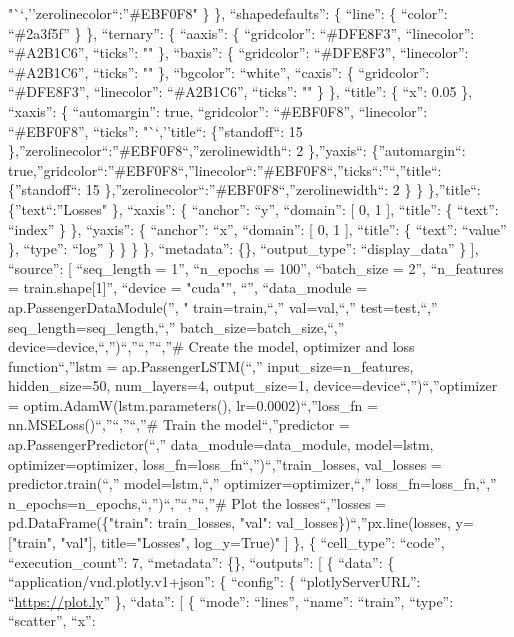 \documentclass[
]{article}
\begin{document}
"``,''zerolinecolor``:''\#EBF0F8" \} \}, ``shapedefaults'': \{ ``line'':
\{ ``color'': ``\#2a3f5f'' \} \}, ``ternary'': \{ ``aaxis'': \{
``gridcolor'': ``\#DFE8F3'', ``linecolor'': ``\#A2B1C6'', ``ticks'': ""
\}, ``baxis'': \{ ``gridcolor'': ``\#DFE8F3'', ``linecolor'':
``\#A2B1C6'', ``ticks'': "" \}, ``bgcolor'': ``white'', ``caxis'': \{
``gridcolor'': ``\#DFE8F3'', ``linecolor'': ``\#A2B1C6'', ``ticks'': ""
\} \}, ``title'': \{ ``x'': 0.05 \}, ``xaxis'': \{ ``automargin'': true,
``gridcolor'': ``\#EBF0F8'', ``linecolor'': ``\#EBF0F8'', ``ticks'':
"``,''title``: \{''standoff``: 15
\},''zerolinecolor``:''\#EBF0F8``,''zerolinewidth``: 2 \},''yaxis``:
\{''automargin``:
true,''gridcolor``:''\#EBF0F8``,''linecolor``:''\#EBF0F8``,''ticks``:''``,''title``:
\{''standoff``: 15 \},''zerolinecolor``:''\#EBF0F8``,''zerolinewidth``:
2 \} \} \},''title``: \{''text``:''Losses" \}, ``xaxis'': \{ ``anchor'':
``y'', ``domain'': {[} 0, 1 {]}, ``title'': \{ ``text'': ``index'' \}
\}, ``yaxis'': \{ ``anchor'': ``x'', ``domain'': {[} 0, 1 {]},
``title'': \{ ``text'': ``value'' \}, ``type'': ``log'' \} \} \} \},
``metadata'': \{\}, ``output\_type'': ``display\_data'' \} {]},
``source'': {[} ``seq\_length = 1\n'', ``n\_epochs = 100\n'',
``batch\_size = 2\n'', ``n\_features = train.shape{[}1{]}\n'', ``device
= "cuda"\n'', ``\n'', ``data\_module = ap.PassengerDataModule(\n'', "
train=train,\n``,'' val=val,\n``,'' test=test,\n``,''
seq\_length=seq\_length,\n``,'' batch\_size=batch\_size,\n``,''
device=device,\n``,'')\n``,''\n``,''\n``,''\# Create the model,
optimizer and loss function\n``,''lstm = ap.PassengerLSTM(\n``,''
input\_size=n\_features, hidden\_size=50, num\_layers=4, output\_size=1,
device=device\n``,'')\n``,''optimizer = optim.AdamW(lstm.parameters(),
lr=0.0002)\n``,''loss\_fn = nn.MSELoss()\n``,''\n``,''\n``,''\# Train
the model\n``,''predictor = ap.PassengerPredictor(\n``,''
data\_module=data\_module, model=lstm, optimizer=optimizer,
loss\_fn=loss\_fn\n``,'')\n``,''train\_losses, val\_losses =
predictor.train(\n``,'' model=lstm,\n``,'' optimizer=optimizer,\n``,''
loss\_fn=loss\_fn,\n``,''
n\_epochs=n\_epochs,\n``,'')\n``,''\n``,''\n``,''\# Plot the
losses\n``,''losses = pd.DataFrame(\{"train": train\_losses, "val":
val\_losses\})\n``,''px.line(losses, y={[}"train", "val"{]},
title="Losses", log\_y=True)\n" {]} \}, \{ ``cell\_type'': ``code'',
``execution\_count'': 7, ``metadata'': \{\}, ``outputs'': {[} \{
``data'': \{ ``application/vnd.plotly.v1+json'': \{ ``config'': \{
``plotlyServerURL'': ``\url{https://plot.ly}'' \}, ``data'': {[} \{
``mode'': ``lines'', ``name'': ``train'', ``type'': ``scatter'', ``x'':
\end{document}
